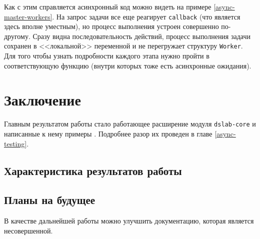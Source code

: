 Как с этим справляется асинхронный код можно видеть на примере \ref{async-master-workers}. На запрос задачи все еще реагирует \texttt{callback} (что является здесь вполне уместным), но процесс выполнения устроен совершенно по-другому. Сразу видна последовательность действий, процесс выполнения задачи сохранен в <<локальной>> переменной и не перегружает структуру \texttt{Worker}. Для того чтобы узнать подробности каждого этапа нужно пройти в соответствующую функцию (внутри которых тоже есть асинхронные ожидания). 
 

\section{Заключение}

Главным результатом работы стало работающее расширение модуля \texttt{dslab-core} \cite{async-dslab-core} и написанные к нему примеры \cite{async-ping-pong-example}\cite{async-event-details-example}\cite{async-master-workers-example}. Подробнее разор их проведен в главе \ref{async-testing}.

\subsection{Характеристика результатов работы}

\subsection{Планы на будущее}

В качестве дальнейшей работы можно улучшить документацию, которая является несовершенной. 



